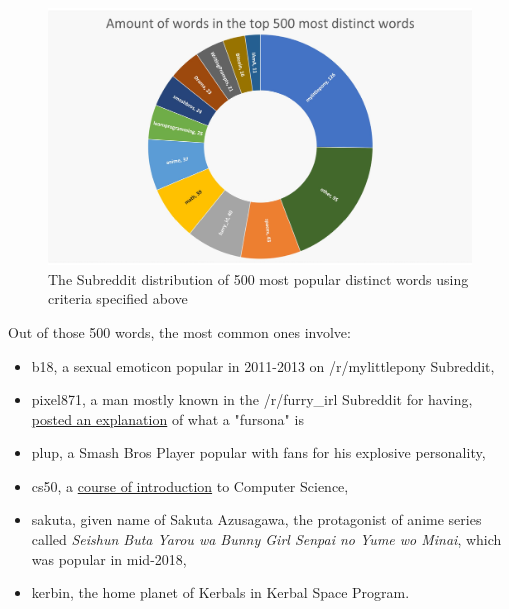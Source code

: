\documentclass[openany]{article}
\begin{document}
\begin{figure}[H]
    \centering
    \includegraphics[width=\textwidth]{top500distinctwords.pdf}
    \caption{The Subreddit distribution of 500 most popular distinct words using criteria specified above}
    \label{fig:mesh1}
\end{figure}
Out of those 500 words, the most common ones involve:
\begin{itemize}
    \item b18, a sexual emoticon popular in 2011-2013 on /r/mylittlepony Subreddit,
    \item pixel871, a man mostly known in the /r/furry\_irl Subreddit for having, \href{https://np.reddit.com/r/delusionalartists/comments/8y1mfe/furbuy_is_a_goldmine_500_for_this_kangaroo/e27nibu/?context=1}{posted an explanation} of what a "fursona" is
    \item plup, a Smash Bros Player popular with fans for his explosive personality,
    \item cs50, a \href{https://www.edx.org/course/cs50s-introduction-to-computer-science}{course of introduction} to Computer Science,
    \item sakuta, given name of Sakuta Azusagawa, the protagonist of anime series called \textit{Seishun Buta Yarou wa Bunny Girl Senpai no Yume wo Minai}, which was popular in mid-2018,
    \item kerbin, the home planet of Kerbals in Kerbal Space Program.
\end{itemize}
\end{document}
